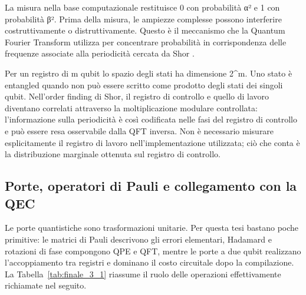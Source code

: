La misura nella base computazionale restituisce 0 con probabilità \textbar α\textbar² e 1 con probabilità \textbar β\textbar². Prima della misura, le ampiezze complesse possono interferire costruttivamente o distruttivamente. Questo è il meccanismo che la Quantum Fourier Transform utilizza per concentrare probabilità in corrispondenza delle frequenze associate alla periodicità cercata da Shor \cite{nielsenChuang2000}.

Per un registro di m qubit lo spazio degli stati ha dimensione 2\^{}m. Uno stato è entangled quando non può essere scritto come prodotto degli stati dei singoli qubit. Nell'order finding di Shor, il registro di controllo e quello di lavoro diventano correlati attraverso la moltiplicazione modulare controllata: l'informazione sulla periodicità è così codificata nelle fasi del registro di controllo e può essere resa osservabile dalla QFT inversa. Non è necessario misurare esplicitamente il registro di lavoro nell'implementazione utilizzata; ciò che conta è la distribuzione marginale ottenuta sul registro di controllo.

\subsection{Porte, operatori di Pauli e collegamento con la QEC}\label{sec:finale_3_1_2}

Le porte quantistiche sono trasformazioni unitarie. Per questa tesi bastano poche primitive: le matrici di Pauli descrivono gli errori elementari, Hadamard e rotazioni di fase compongono QPE e QFT, mentre le porte a due qubit realizzano l'accoppiamento tra registri e dominano il costo circuitale dopo la compilazione. La Tabella~\ref{tab:finale_3_1} riassume il ruolo delle operazioni effettivamente richiamate nel seguito.

